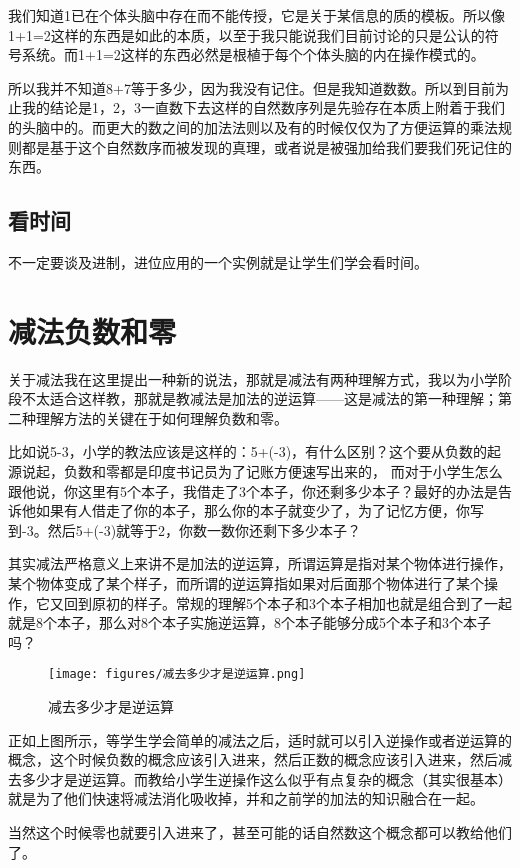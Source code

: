 \documentclass[11pt,oneside]{article}
\begin{document}
我们知道1已在个体头脑中存在而不能传授，它是关于某信息的质的模板。所以像1+1=2这样的东西是如此的本质，以至于我只能说我们目前讨论的只是公认的符号系统。而1+1=2这样的东西必然是根植于每个个体头脑的内在操作模式的。

所以我并不知道8+7等于多少，因为我没有记住。但是我知道数数。所以到目前为止我的结论是1，2，3一直数下去这样的自然数序列是先验存在本质上附着于我们的头脑中的。而更大的数之间的加法法则以及有的时候仅仅为了方便运算的乘法规则都是基于这个自然数序而被发现的真理，或者说是被强加给我们要我们死记住的东西。

\subsection{看时间}
\label{sec-4-1}
不一定要谈及进制，进位应用的一个实例就是让学生们学会看时间。

\section{减法负数和零}
\label{sec-5}
关于减法我在这里提出一种新的说法，那就是减法有两种理解方式，我以为小学阶段不太适合这样教，那就是教减法是加法的逆运算——这是减法的第一种理解；第二种理解方法的关键在于如何理解负数和零。

比如说5-3，小学的教法应该是这样的：5+(-3)，有什么区别？这个要从负数的起源说起，负数和零都是印度书记员为了记账方便速写出来的， 而对于小学生怎么跟他说，你这里有5个本子，我借走了3个本子，你还剩多少本子？最好的办法是告诉他如果有人借走了你的本子，那么你的本子就变少了，为了记忆方便，你写到-3。然后5+(-3)就等于2，你数一数你还剩下多少本子？

其实减法严格意义上来讲不是加法的逆运算，所谓运算是指对某个物体进行操作，某个物体变成了某个样子，而所谓的逆运算指如果对后面那个物体进行了某个操作，它又回到原初的样子。常规的理解5个本子和3个本子相加也就是组合到了一起就是8个本子，那么对8个本子实施逆运算，8个本子能够分成5个本子和3个本子吗？
\begin{figure}[H]
\centering
\texttt{[image: figures/减去多少才是逆运算.png]}
\caption{减去多少才是逆运算}
\end{figure}

正如上图所示，等学生学会简单的减法之后，适时就可以引入逆操作或者逆运算的概念，这个时候负数的概念应该引入进来，然后正数的概念应该引入进来，然后减去多少才是逆运算。而教给小学生逆操作这么似乎有点复杂的概念（其实很基本）就是为了他们快速将减法消化吸收掉，并和之前学的加法的知识融合在一起。

当然这个时候零也就要引入进来了，甚至可能的话自然数这个概念都可以教给他们了。
\end{document}
